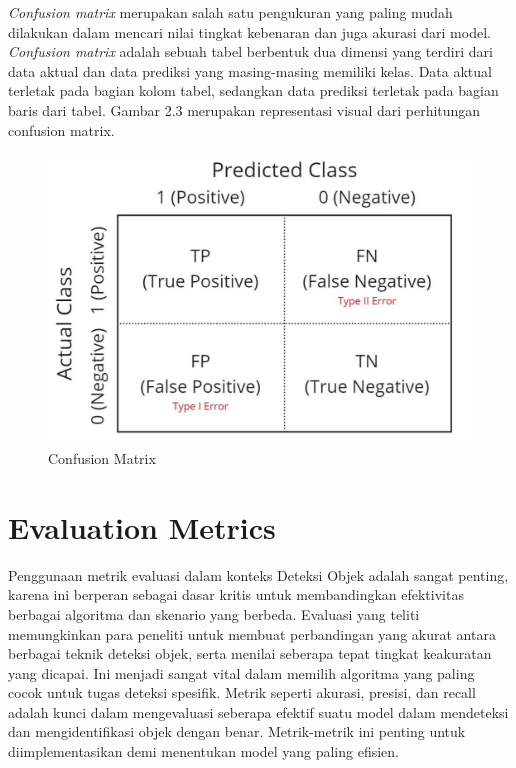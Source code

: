 \emph{Confusion matrix} merupakan salah satu pengukuran yang paling mudah dilakukan dalam mencari nilai tingkat kebenaran dan juga akurasi dari model. \emph{Confusion matrix} adalah sebuah tabel berbentuk dua dimensi yang terdiri dari data aktual dan data prediksi yang masing-masing memiliki kelas. Data aktual terletak pada bagian kolom tabel, sedangkan data prediksi terletak pada bagian baris dari tabel. Gambar 2.3 merupakan representasi visual dari perhitungan confusion matrix.

\begin{figure}[H]
  \centering

  \includegraphics[scale=0.6]{gambar/halaman 37_page-0001 (1).jpg}

  \caption{Confusion Matrix}
  \label{fig:Confusion Matrix}
\end{figure}

\section{Evaluation Metrics}
\label{sec:gravitasi}
Penggunaan metrik evaluasi dalam konteks Deteksi Objek adalah sangat penting, karena ini berperan sebagai dasar kritis untuk membandingkan efektivitas berbagai algoritma dan skenario yang berbeda. Evaluasi yang teliti memungkinkan para peneliti untuk membuat perbandingan yang akurat antara berbagai teknik deteksi objek, serta menilai seberapa tepat tingkat keakuratan yang dicapai. Ini menjadi sangat vital dalam memilih algoritma yang paling cocok untuk tugas deteksi spesifik. Metrik seperti akurasi, presisi, dan recall adalah kunci dalam mengevaluasi seberapa efektif suatu model dalam mendeteksi dan mengidentifikasi objek dengan benar. Metrik-metrik ini penting untuk diimplementasikan demi menentukan model yang paling efisien.


